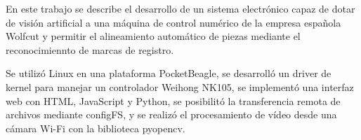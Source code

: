 En este trabajo se describe el desarrollo de un sistema electrónico capaz de dotar de visión artificial a una máquina de control numérico de la empresa española Wolfcut y permitir el alineamiento automático de piezas mediante el reconocimiennto de marcas de registro.\par
Se utilizó Linux en una plataforma PocketBeagle, se desarrolló un driver de kernel para manejar un controlador Weihong NK105, se implementó una interfaz web con HTML, JavaScript y Python, se posibilitó la transferencia remota de archivos mediante configFS, y se realizó el procesamiento de vídeo desde una cámara Wi-Fi con la biblioteca pyopencv.

